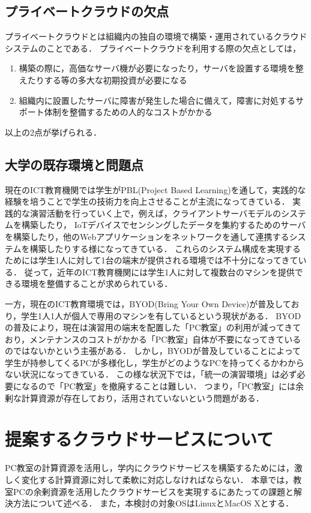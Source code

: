 \documentclass[11pt,a4paper]{jsarticle}
\begin{document}
\subsection{プライベートクラウドの欠点}
プライベートクラウドとは組織内の独自の環境で構築・運用されているクラウドシステムのことである．
プライベートクラウドを利用する際の欠点としては，
\begin{enumerate}
	\item 構築の際に，高価なサーバ機が必要になったり，サーバを設置する環境を整えたりする等の多大な初期投資が必要になる
	\item 組織内に設置したサーバに障害が発生した場合に備えて，障害に対処するサポート体制を整備するための人的なコストがかかる
\end{enumerate}
以上の2点が挙げられる．

\subsection{大学の既存環境と問題点}
現在のICT教育機関では学生がPBL(Project Based Learning)を通して，実践的な経験を培うことで学生の技術力を向上させることが主流になってきている．
実践的な演習活動を行っていく上で，例えば，クライアントサーバモデルのシステムを構築したり，
IoTデバイスでセンシングしたデータを集約するためのサーバを構築したり，他のWebアプリケーションをネットワークを通して連携するシステムを構築したりする様になってきている．
これらのシステム構成を実現するためには学生1人に対して1台の端末が提供される環境では不十分になってきている．
従って，近年のICT教育機関には学生1人に対して複数台のマシンを提供できる環境を整備することが求められている．
\par 一方，現在のICT教育環境では，BYOD(Bring Your Own Device)が普及しており，学生1人1人が個人で専用のマシンを有しているという現状がある．
BYODの普及により，現在は演習用の端末を配置した「PC教室」の利用が減ってきており，メンテナンスのコストがかかる「PC教室」自体が不要になってきているのではないかという主張がある．
しかし，BYODが普及していることによって学生が持参してくるPCが多様化し，学生がどのようなPCを持ってくるかわからない状況になってきている．
この様な状況下では，「統一の演習環境」は必ず必要になるので「PC教室」を撤廃することは難しい．
つまり，「PC教室」には余剰な計算資源が存在しており，活用されていないという問題がある．

\section{提案するクラウドサービスについて}
PC教室の計算資源を活用し，学内にクラウドサービスを構築するためには，激しく変化する計算資源に対して柔軟に対応しなければならない．
本章では，教室PCの余剰資源を活用したクラウドサービスを実現するにあたっての課題と解決方法について述べる．
また，本検討の対象OSはLinuxとMacOS Xとする．
\end{document}
